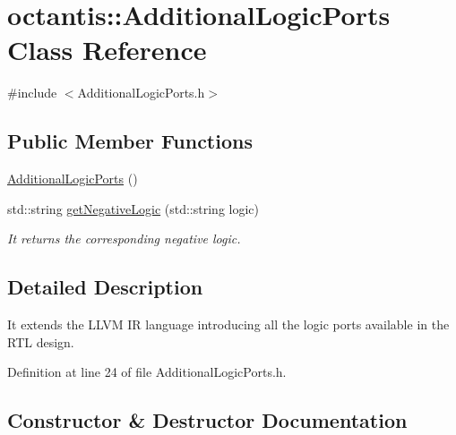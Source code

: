 \hypertarget{classoctantis_1_1AdditionalLogicPorts}{}\section{octantis\+:\+:Additional\+Logic\+Ports Class Reference}
\label{classoctantis_1_1AdditionalLogicPorts}


{\ttfamily \#include $<$Additional\+Logic\+Ports.\+h$>$}

\subsection*{Public Member Functions}
\begin{DoxyCompactItemize}
\item 
\hyperlink{classoctantis_1_1AdditionalLogicPorts_a0c1279363e919e4d82caddf4a486f56e}{Additional\+Logic\+Ports} ()
\item 
std\+::string \hyperlink{classoctantis_1_1AdditionalLogicPorts_a375d3e65187034c5c2fdf80bf22d49d7}{get\+Negative\+Logic} (std\+::string logic)
\begin{DoxyCompactList}\small\item\em It returns the corresponding negative logic. \end{DoxyCompactList}\end{DoxyCompactItemize}


\subsection{Detailed Description}
It extends the L\+L\+VM IR language introducing all the logic ports available in the R\+TL design. 

Definition at line 24 of file Additional\+Logic\+Ports.\+h.



\subsection{Constructor \& Destructor Documentation}
\mbox{\label{classoctantis_1_1AdditionalLogicPorts_a0c1279363e919e4d82caddf4a486f56e}} 
